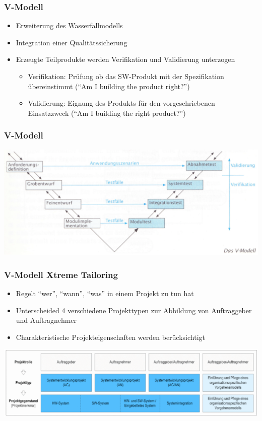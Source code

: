 \begin{frame}
\frametitle{V-Modell}
	\begin{itemize}
		\item Erweiterung des Wasserfallmodells
		\item Integration einer Qualitätssicherung
		\item Erzeugte Teilprodukte werden Verifikation und Validierung unterzogen
		\begin{itemize}
			\item Verifikation: Prüfung ob das SW-Produkt mit der Spezifikation
			übereinstimmt (``Am I building the product right?'')
			\item Validierung: Eignung des Produkts für den vorgeschriebenen
			Einsatzzweck (``Am I building the right product?'')
		\end{itemize}
	\end{itemize}
\end{frame}

\begin{frame}
\frametitle{V-Modell}
	\center\includegraphics[width=1\textwidth,
			keepaspectratio=true]{bilder/vmodell.png}
\end{frame}

\begin{frame}
\frametitle{V-Modell Xtreme Tailoring}
	\begin{itemize}
		\item Regelt ``wer'', ``wann'', ``was'' in einem Projekt zu tun hat
		\item Unterscheided 4 verschiedene Projekttypen zur Abbildung von
		Auftraggeber und Auftragnehmer
		\item Charakteristische Projekteigenschaften werden berücksichtigt
	\end{itemize}
	\center\includegraphics[width=1\textwidth,
			keepaspectratio=true]{bilder/vmodell_typen.png}
\end{frame}

